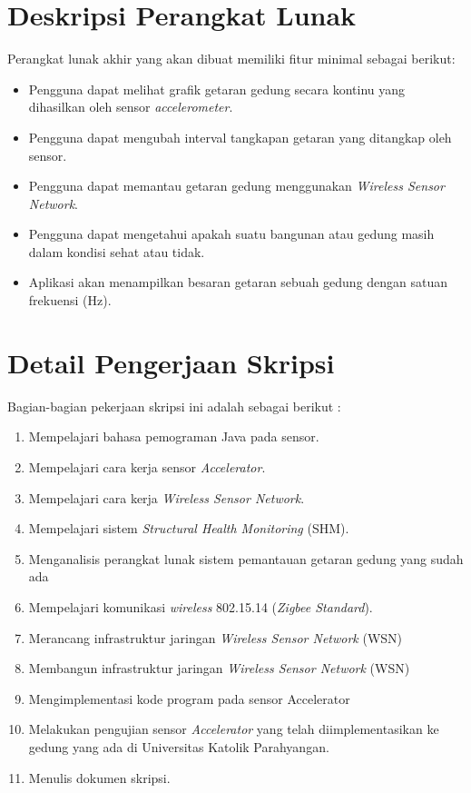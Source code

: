 \documentclass[a4paper,twoside]{article}
\begin{document}
\section{Deskripsi Perangkat Lunak}
Perangkat lunak akhir yang akan dibuat memiliki fitur minimal sebagai berikut:
\begin{itemize}
	\item Pengguna dapat melihat grafik getaran gedung secara kontinu yang dihasilkan oleh sensor \textit{accelerometer}.
	\item Pengguna dapat mengubah interval tangkapan getaran yang ditangkap oleh sensor.
	\item Pengguna dapat memantau getaran gedung menggunakan \textit{Wireless Sensor Network}.
	\item Pengguna dapat mengetahui apakah suatu bangunan atau gedung masih dalam kondisi sehat atau tidak.
	\item Aplikasi akan menampilkan besaran getaran sebuah gedung dengan satuan frekuensi (Hz).
\end{itemize}

\section{Detail Pengerjaan Skripsi}
Bagian-bagian pekerjaan skripsi ini adalah sebagai berikut :
	\begin{enumerate}
		\item Mempelajari bahasa pemograman Java pada sensor.
		\item Mempelajari cara kerja sensor \textit{Accelerator}.
		\item Mempelajari cara kerja \textit{Wireless Sensor Network}.
		\item Mempelajari sistem \textit{Structural Health Monitoring} (SHM).
		\item Menganalisis perangkat lunak sistem pemantauan getaran gedung yang sudah ada
		\item Mempelajari komunikasi \textit{wireless} 802.15.14 (\textit{Zigbee Standard}).
		\item Merancang infrastruktur jaringan \textit{Wireless Sensor Network} (WSN)
		\item Membangun infrastruktur jaringan \textit{Wireless Sensor Network} (WSN)
		\item Mengimplementasi kode program pada sensor Accelerator
		\item Melakukan pengujian sensor \textit{Accelerator} yang telah diimplementasikan ke gedung yang ada di Universitas Katolik Parahyangan.
		\item Menulis dokumen skripsi.
	\end{enumerate}
\end{document}
